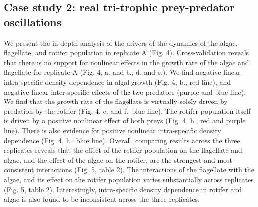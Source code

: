 \documentclass[11pt, oneside]{article}
\begin{document}
\subsection{Case study 2: real tri-trophic prey-predator oscillations}

We present the in-depth analysis of the drivers of the dynamics of the algae, flagellate, and rotifer population in replicate A (Fig. 4).
Cross-validation reveals that there is no support for nonlinear effects in the growth rate of the algae and flagellate for replicate A (Fig. 4, a. and b., d. and e.). 
We find negative linear intra-specific density dependence in algal growth (Fig. 4, b., red line), and negative linear inter-specific effects of the two predators (purple and blue line).
We find that the growth rate of the flagellate is virtually solely driven by predation by the rotifer (Fig. 4, e. and f., blue line).
The rotifer population itself is driven by a positive nonlinear effect of both preys (Fig. 4, h., red and purple line).
There is also evidence for positive nonlinear intra-specific density dependence (Fig. 4, h., blue line).
Overall, comparing results across the three replicates reveals that the effect of the rotifer population on the flagellate and algae, and the effect of the algae on the rotifer, are the strongest and most consistent interactions (Fig. 5, table 2).
The interactions of the flagellate with the algae, and its effect on the rotifer population varies substantially across replicates (Fig. 5, table 2). 
Interestingly, intra-specific density dependence in rotifer and algae is also found to be inconsistent across the three replicates.
\end{document}
